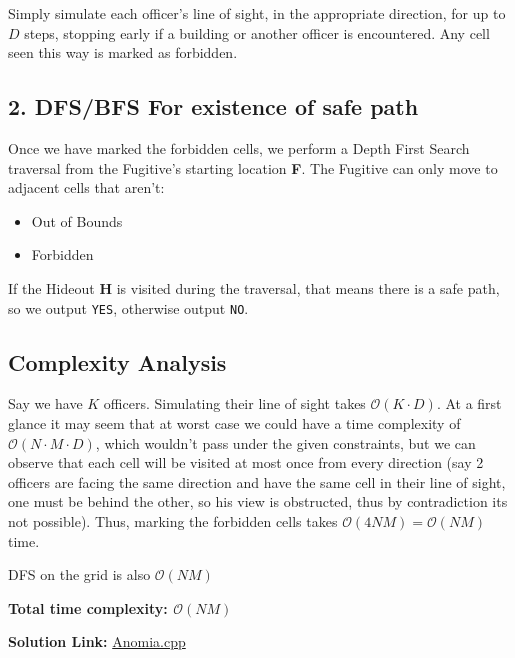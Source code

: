 \documentclass{article}
\begin{document}
        \noindent Simply simulate each officer's line of sight, in the appropriate direction, for up to $ D $ steps,
        stopping early if a building or another officer is encountered. Any cell seen this way is marked as
        forbidden.
        

    \subsection*{2. DFS/BFS For existence of safe path}

        \noindent Once we have marked the forbidden cells, we perform a Depth First Search traversal from
        the Fugitive's starting location \textbf{F}. The Fugitive can only move to adjacent cells that aren't:
        \begin{itemize}
            \item{Out of Bounds}
            \item{Forbidden}
        \end{itemize}

        \noindent If the Hideout \textbf{H} is visited during the traversal, that means there is a safe path,
        so we output \texttt{YES}, otherwise output \texttt{NO}.


    \subsection*{Complexity Analysis}
        \noindent Say we have $ K $ officers. Simulating their line of sight takes $ \mathcal{O}(K \cdot D) $. At a first glance it may seem that at worst case we could have a time complexity of $ \mathcal{O}(N \cdot M \cdot
        D)$, which wouldn't pass under the given constraints, but we can observe that each cell will be visited
        at most once from every direction (say 2 officers are facing the same direction and have the same
        cell in their line of sight, one must be behind the other, so his view is obstructed, thus by contradiction its not possible).
        \noindent Thus, marking the forbidden cells takes $ \mathcal{O}(4NM) = \mathcal{O}(NM)$ time.

        
        \noindent
        DFS on the grid is also $ \mathcal{O}(NM)$
        \vspace{1em}

        
        \noindent
        \textbf{Total time complexity: $ \mathcal{O}(NM) $}
        
    \vspace{1em}
    \noindent \textbf{Solution Link:} 
    \href{https://github.com/StathisKons/GRCPC-2024-Editorial-Implementations/blob/main/Sample%20Implementations/F.%20Anomia.cpp}{Anomia.cpp}
    \vspace{1em}
    
\end{document}
